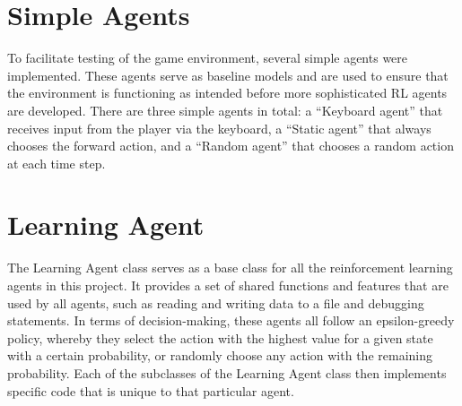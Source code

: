 \section{Simple Agents}
To facilitate testing of the game environment, several simple agents were implemented. These agents serve as baseline models and are used to ensure that the environment is functioning as intended before more sophisticated RL agents are developed. There are three simple agents in total: a ``Keyboard agent'' that receives input from the player via the keyboard, a ``Static agent'' that always chooses the forward action, and a ``Random agent'' that chooses a random action at each time step. 

\section{Learning Agent}
The Learning Agent class serves as a base class for all the reinforcement learning agents in this project. It provides a set of shared functions and features that are used by all agents, such as reading and writing data to a file and debugging statements. In terms of decision-making, these agents all follow an epsilon-greedy policy, whereby they select the action with the highest value for a given state with a certain probability, or randomly choose any action with the remaining probability. Each of the subclasses of the Learning Agent class then implements specific code that is unique to that particular agent.
